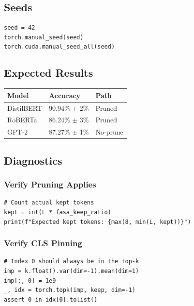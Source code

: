 \subsection{Seeds}

\begin{lstlisting}
seed = 42
torch.manual_seed(seed)
torch.cuda.manual_seed_all(seed)
\end{lstlisting}

\subsection{Expected Results}

\begin{table}[H]
\centering
\small
\begin{tabular}{lll}
\toprule
\textbf{Model} & \textbf{Accuracy} & \textbf{Path} \\
\midrule
DistilBERT & 90.94\% $\pm$ 2\% & Pruned \\
RoBERTa & 86.24\% $\pm$ 3\% & Pruned \\
GPT-2 & 87.27\% $\pm$ 1\% & No-prune \\
\bottomrule
\end{tabular}
\end{table}

\subsection{Diagnostics}

\subsubsection{Verify Pruning Applies}

\begin{lstlisting}
# Count actual kept tokens
kept = int(L * fasa_keep_ratio)
print(f"Expected kept tokens: {max(8, min(L, kept))}")
\end{lstlisting}

\subsubsection{Verify CLS Pinning}

\begin{lstlisting}
# Index 0 should always be in the top-k
imp = k.float().var(dim=-1).mean(dim=1)
imp[:, 0] = 1e9
_, idx = torch.topk(imp, keep, dim=-1)
assert 0 in idx[0].tolist()
\end{lstlisting}

